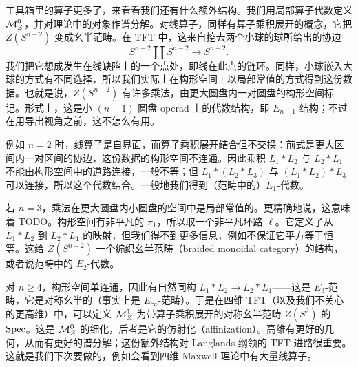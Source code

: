 工具箱里的算子更多了，来看看我们还有什么额外结构。我们用局部算子代数定义 $\mathcal{M}^0_Z$，并对理论中的对象作谱分解。对线算子，同样有算子乘积展开的概念，它把 $Z(S^{n-2})$ 变成幺半范畴。在 TFT 中，这来自挖去两个小球的球所给出的协边
\[
S^{n-2}\amalg S^{n-2}\longrightarrow S^{n-2}.
\]
我们把它想成发生在线缺陷上的一个点处，即线在此点的链环。同样，小球嵌入大球的方式有不同选择，所以我们实际上在构形空间上以局部常值的方式得到这份数据。也就是说，$Z(S^{n-2})$ 有许多乘法，由更大圆盘内一对圆盘的构形空间标记。形式上，这是小 $(n-1)$-圆盘 operad 上的代数结构，即 $E_{n-1}$-结构；不过在用导出视角之前，这不怎么有用。

例如 $n=2$ 时，线算子是自界面，而算子乘积展开结合但不交换：前式是更大区间内一对区间的协边，这份数据的构形空间不连通。因此乘积 $L_1*L_2$ 与 $L_2*L_1$ 不能由构形空间中的道路连接，一般不等；但 $L_1*(L_2*L_3)$ 与 $(L_1*L_2)*L_3$ 可以连接，所以这个代数结合。一般地我们得到（范畴中的）$E_1$-代数。

若 $n=3$，乘法在更大圆盘内小圆盘的空间中是局部常值的。更精确地说，这意味着 TODO。构形空间有非平凡的 $\pi_1$，所以取一个非平凡环路 $\ell$。它定义了从 $L_1*L_2$ 到 $L_2*L_1$ 的映射，但我们得不到更多信息，例如不保证它平方等于恒等。这给 $Z(S^{n-2})$ 一个编织幺半范畴（braided monoidal category）的结构，或者说范畴中的 $E_2$-代数。

对 $n\ge4$，构形空间单连通，因此有自然同构 $L_1*L_2\to L_2*L_1$——这是 $E_3$-范畴，它是对称幺半的（事实上是 $E_\infty$-范畴）。于是在四维 TFT（以及我们不关心的更高维）中，可以定义 $\mathcal{M}^1_Z$ 为带算子乘积展开的对称幺半范畴 $Z(S^2)$ 的 $\operatorname{Spec}$。这是 $\mathcal{M}^0_Z$ 的细化，后者是它的仿射化（affinization）。高维有更好的几何，从而有更好的谱分解；这份额外结构对 Langlands 纲领的 TFT 进路很重要。这就是我们下次要做的，例如会看到四维 Maxwell 理论中有大量线算子。
